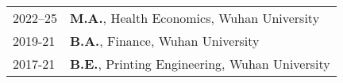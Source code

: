 

\renewcommand{\thefootnote}{\fnsymbol{footnote}}
\setcounter{footnote}{0}

\begin{longtable}[l]{@{}p{} p{}}
    2022--25 & \textbf{M.A.}, Health Economics, Wuhan University \\
    2019-21 & \textbf{B.A.}, Finance, Wuhan University \\

    2017-21 & \textbf{B.E.}, Printing Engineering, Wuhan University \\

\end{longtable}



\renewcommand{\thefootnote}{\arabic{footnote}}
\setcounter{footnote}{1}
